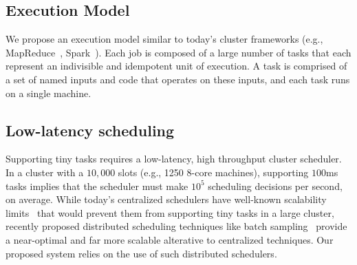 \subsection{Execution Model}
We propose an execution model similar to today's cluster frameworks (e.g.,
MapReduce~\cite{dean2008mapreduce}, Spark~\cite{zaharia2010spark}). Each job is composed of a large number
of tasks that each represent an indivisible and idempotent unit of
execution. A task is comprised of a set of named
inputs and code that operates on these inputs, and each task runs on a single
machine.

\subsection{Low-latency scheduling}
Supporting tiny tasks requires a low-latency, high throughput cluster scheduler.
In a cluster with a $10,000$ slots (e.g., 1250 8-core machines),
supporting $100$ms tasks implies that the scheduler must make $10^5$ scheduling
decisions per second, on average.
While today's centralized schedulers have well-known scalability
limits~\cite{wilkesberkeley} that
would prevent them from supporting tiny tasks in a large cluster,
recently proposed distributed scheduling techniques like batch
sampling~\cite{ousterhoutbatch} provide a near-optimal and far more scalable
alterative to centralized techniques.
Our proposed system relies on the use of such distributed schedulers.

